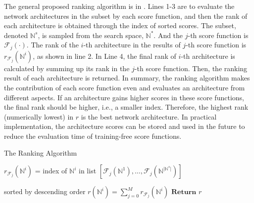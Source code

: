 \documentclass[sigconf]{acmart}
\begin{document}
    The general proposed ranking algorithm is in . 
    Lines 1-3 are to evaluate the network architectures in the subset 
    by each score function, and then the rank of each architecture is 
    obtained through the index of sorted scores. The subset, denoted 
    $\mathbb N^s$, is sampled from the search space, $\mathbb N^*$. And 
    the $j$-th score function is $\mathcal F_j(\cdot)$. The rank of the 
    $i$-th architecture in the results of $j$-th score function is 
    $r_{\mathcal F_j}(\mathbb N^i)$, as shown in line 2. In Line 4, 
    the final rank of $i$-th architecture is calculated by summing up 
    its rank in the $j$-th score function. Then, the ranking result of each 
    architecture is returned. In summary, the ranking algorithm makes the 
    contribution of each score function even and evaluates an architecture 
    from different aspects. If an architecture gains higher scores in these 
    score functions, the final rank should be higher, i.e., a smaller index. 
    Therefore, the highest rank (numerically lowest) in $r$ is the best 
    network architecture. In practical implementation, the architecture scores 
    can be stored and used in the future to reduce the evaluation time of 
    training-free score functions. 

    \begin{algorithm}[h]
        \caption{The Ranking Algorithm}\label{alg:rank-based}
        \begin{algorithmic}[1]
                \State $r_{{\mathcal F}_{j}}({\mathbb N}^i)$ = index of ${\mathbb N}^i$ in list $[{\mathcal F}_{j}({\mathbb N}^1),\ldots,{\mathcal F}_{j}({\mathbb N}^{\lvert {\mathbb N}^s\rvert})]$ \par sorted by descending order
            \EndFor
            \State $r({\mathbb N}^i)=\sum^M_{j=0} r_{{\mathcal F}_{j}}({\mathbb N}^i)$
            \State $\textbf{Return }r$
        \end{algorithmic}
    \end{algorithm}
\end{document}
